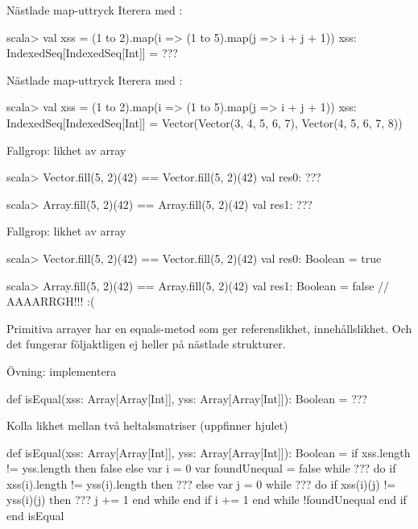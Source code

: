 \begin{Slide}{Nästlade map-uttryck}\SlideFontSmall
Iterera med :\\
\begin{REPL}
scala> val xss = (1 to 2).map(i => (1 to 5).map(j => i + j + 1))
xss: IndexedSeq[IndexedSeq[Int]] =
      ???
\end{REPL}
\end{Slide}

\begin{Slide}{Nästlade map-uttryck}\SlideFontSmall
Iterera med :\\
\begin{REPL}
scala> val xss = (1 to 2).map(i => (1 to 5).map(j => i + j + 1))
xss: IndexedSeq[IndexedSeq[Int]] =
      Vector(Vector(3, 4, 5, 6, 7), Vector(4, 5, 6, 7, 8))
\end{REPL}
\end{Slide}



\ifkompendium\else
\begin{Slide}{Fallgrop: likhet av array}
\begin{REPL}
scala> Vector.fill(5, 2)(42) == Vector.fill(5, 2)(42)
val res0: ???

scala> Array.fill(5, 2)(42) == Array.fill(5, 2)(42)
val res1: ???
\end{REPL}
\end{Slide}
\fi

\begin{Slide}{Fallgrop: likhet av array}
\begin{REPL}
scala> Vector.fill(5, 2)(42) == Vector.fill(5, 2)(42)
val res0: Boolean = true

scala> Array.fill(5, 2)(42) == Array.fill(5, 2)(42)
val res1: Boolean = false  // AAAARRGH!!! :(
\end{REPL}
Primitiva arrayer har en equals-metod som ger referenslikhet,  innehållslikhet. Och det fungerar följaktligen ej heller på nästlade strukturer. 

\vspace{1em} Övning: implementera 
\begin{Code}
def isEqual(xss: Array[Array[Int]], yss: Array[Array[Int]]): Boolean = ???
\end{Code}

\end{Slide}

\ifkompendium\else
\begin{Slide}{Kolla likhet mellan två heltalsmatriser (uppfinner hjulet)}
\begin{CodeSmall}
def isEqual(xss: Array[Array[Int]], yss: Array[Array[Int]]): Boolean = 
  if xss.length != yss.length then false else
    var i = 0
    var foundUnequal = false
    while ??? do
      if xss(i).length != yss(i).length then 
        ???
      else 
        var j = 0
        while ??? do
          if xss(i)(j) != yss(i)(j) then ???
          j += 1
        end while
      end if
      i += 1
    end while
    !foundUnequal
  end if
end isEqual
\end{CodeSmall}
\end{Slide}
\fi


